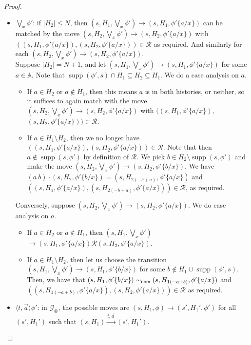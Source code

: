 \documentclass[10pt,a4paper]{article}
\theoremstyle{definition}
\theoremstyle{remark}
\newcommand\nomeq[0]{\sim_{\sf nom}}
\DeclareMathOperator{\supp}{supp}
\newcommand\diam[1]{\langle#1\rangle}
\newcommand\Gcal{\mathcal{G}}
\newcommand\Rcal{\mathcal{R}}
\newcommand\Atoms{\mathbb{A}}
\renewcommand\S{N}
\newcommand\fgame[0]{\Gcal_\circledast}
\begin{document}
\begin{proof}
\begin{itemize}
                \item $\bigvee_x \phi'$: 
        if $|H_2| \le \S$, then $(s, H_1, \bigvee_x \phi') \rightarrow (s, H_1, \phi'\{a/x\})$ can be matched by the move $(s, H_2, \bigvee_x \phi') \rightarrow (s, H_2, \phi'\{a/x\})$ with $((s, H_1, \phi'\{a/x\}), (s, H_2, \phi'\{a/x\})) \in \Rcal$ as required. And similarly for each $(s, H_2, \bigvee_x \phi') \rightarrow (s, H_2, \phi'\{a/x\})$.
        \\
        Suppose $|H_2| = \S+1$, and
        let $(s, H_1, \bigvee_x \phi') \rightarrow (s, H_1, \phi'\{a/x\})$ for some $a \in \Atoms$.
Note that $\supp(\phi', s) \cap H_1 \subseteq H_2 \subseteq H_1$. We do a case analysis on $a$.
        \begin{itemize}
            \item 
        If $a \in H_2$ or $a\notin H_1$, then this means $a$ is in both histories, or neither, so it suffices to again match with the move $(s, H_2, \bigvee_x \phi') \rightarrow (s, H_2, \phi'\{a/x\})$ with $((s, H_1, \phi'\{a/x\})$, $(s, H_2, \phi'\{a/x\})) \in \Rcal$. 
        \item
        If $a \in H_1 \setminus H_2$, then we no longer have 
        $((s, H_1, \phi'\{a/x\}),(s, H_2, \phi'\{a/x\})) \in \Rcal$. 
        Note that then $a\notin\supp(s,\phi')$ by definition of $\Rcal$. 
        We pick $b\in H_2\setminus\supp(s,\phi')$ and make the move
        $(s, H_2, \bigvee_x \phi') \rightarrow (s, H_2, \phi'\{b/x\})$. We have $(a\ b)\cdot(s, H_2, \phi'\{b/x\})=(s, H_{2(-b+a)}, \phi'\{a/x\})$ and
        $((s, H_1, \phi'\{a/x\}),(s, H_{2(-b+a)}, \phi'\{a/x\})) \in \Rcal$, as required.
                \end{itemize}
        Conversely, suppose $(s, H_2, \bigvee_x \phi')\to(s, H_2, \phi'\{a/x\})$. We do case analysis on $a$.
        \begin{itemize}
        \item If $a \in H_2$ or $a \notin H_1$, then
          $(s, H_1, \bigvee_x \phi')$ $ \rightarrow (s, H_1, \phi'\{a/x\})\Rcal(s, H_2, \phi'\{a/x\})$.
                        \item If $a \in H_1 \setminus H_2$, then let us choose the transition $(s, H_1, \bigvee_x \phi') \to (s, H_1, \phi'\{b/x\})$ for some $b \notin H_1 \cup \supp(\phi', s)$.
            Then, we have that $(s, H_1, \phi'\{b/x\}) \nomeq (s, H_{1(-a+b)}, \phi'\{a/x\})$ and $((s, H_{1(-a+b)}, \phi'\{a/x\}),(s, H_2, \phi'\{a/x\})) \in \Rcal$ as required.
        \end{itemize}
                        \item $\diam{t, \vec a} \phi'$: in $\fgame$, the possible moves are $(s, H_1, \phi) \rightarrow (s', H_1', \phi')$ for all $(s', H_1')$ such that $(s, H_1) \xrightarrow{t, \vec a} (s', H_1')$.

\end{itemize}
\end{proof}
\end{document}
